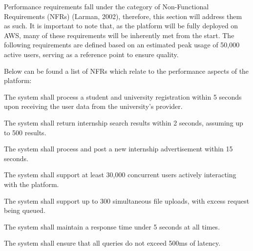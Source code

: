 Performance requirements fall under the category of Non-Functional Requirements (NFRs) (Larman, 2002), therefore, this section will address them as such. It is important to note that, as the platform will be fully deployed on AWS, many of these requirements will be inherently met from the start. The following requirements are defined based on an estimated peak usage of 50,000 active users, serving as a reference point to ensure quality.

Below can be found a list of NFRs which relate to the performance aspects of the platform:

\begin{enumerate}[label={\textbf{[NFR-P\arabic*]}}]
   \item The system shall process a student and university registration within 5 seconds upon receiving the user data from the university's provider.  
   \item The system shall return internship search results within 2 seconds, assuming up to 500 results.
   \item The system shall process and post a new internship advertisement within 15 seconds.
   \item The system shall support at least 30,000 concurrent users actively interacting with the platform.
   \item The system shall support up to 300 simultaneous file uploads, with excess request being queued.
   \item The system shall maintain a response time under 5 seconds at all times.
   \item The system shall ensure that all queries do not exceed 500ms of latency.
\end{enumerate}

